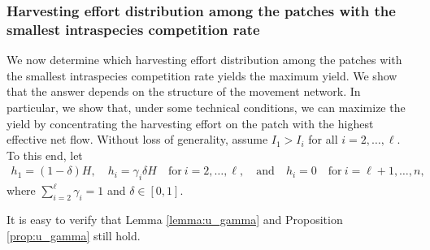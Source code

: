 \documentclass[11pt]{article}
\theoremstyle{definition}
\begin{document}
\subsubsection{Harvesting effort distribution among the patches with the smallest intraspecies competition rate}

We now determine which harvesting effort distribution among the patches with the smallest intraspecies competition rate yields the maximum yield. We show that the answer depends on the structure of the movement network. 
 In particular, we show that, under some technical conditions, we can maximize the yield by concentrating the harvesting effort on the patch with the highest effective net flow. Without loss of generality, assume $I_1>I_i$ for all $i=2,\dots,\ell$. To this end, let
\begin{align}\label{hi_3again}
h_1=(1-\delta)H, \quad  h_i=\gamma_i\delta H \quad \text{for} \  i=2,\dots,\ell, \quad \text{and} \quad h_i=0\quad \text{for}\ i=\ell+1, \dots, n,
\end{align}
where $\sum_{i=2}^\ell \gamma_i=1$ and $\delta\in[0,1]$.


It is easy to verify that Lemma \ref{lemma:u_gamma} and Proposition \ref{prop:u_gamma} still hold.
\end{document}
